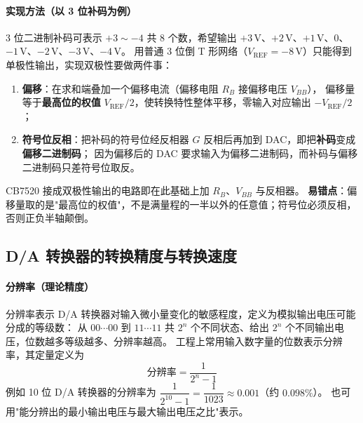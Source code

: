 \paragraph{实现方法（以 3 位补码为例）}
3 位二进制补码可表示 $+3\sim-4$ 共 8 个数，希望输出 $+3\,\mathrm{V}$、$+2\,\mathrm{V}$、$+1\,\mathrm{V}$、$0$、$-1\,\mathrm{V}$、$-2\,\mathrm{V}$、$-3\,\mathrm{V}$、$-4\,\mathrm{V}$。
用普通 3 位倒 T 形网络（$V_\text{REF}=-8\,\mathrm{V}$）只能得到单极性输出，实现双极性要做两件事：
\begin{enumerate}
    \item \textbf{偏移}：在求和端叠加一个偏移电流（偏移电阻 $R_B$ 接偏移电压 $V_{BB}$），
    偏移量等于\textbf{最高位的权值} $V_\text{REF}/2$，使转换特性整体平移，零输入对应输出 $-V_\text{REF}/2$；
    \item \textbf{符号位反相}：把补码的符号位经反相器 $G$ 反相后再加到 DAC，即把\textbf{补码}变成\textbf{偏移二进制码}；
    因为偏移后的 DAC 要求输入为偏移二进制码，而补码与偏移二进制码只差符号位取反。
\end{enumerate}
CB7520 接成双极性输出的电路即在此基础上加 $R_B$、$V_{BB}$ 与反相器。
\textbf{易错点}：偏移量取的是"最高位的权值"，不是满量程的一半以外的任意值；符号位必须反相，否则正负半轴颠倒。

\subsection{D/A 转换器的转换精度与转换速度}
\paragraph{分辨率（理论精度）}
分辨率表示 D/A 转换器对输入微小量变化的敏感程度，定义为模拟输出电压可能分成的等级数：
从 $00\cdots00$ 到 $11\cdots11$ 共 $2^n$ 个不同状态、给出 $2^n$ 个不同输出电压，位数越多等级越多、分辨率越高。
工程上常用输入数字量的位数表示分辨率，其定量定义为
\[
\text{分辨率}=\frac{1}{2^n-1}
\]
例如 10 位 D/A 转换器的分辨率为 $\dfrac{1}{2^{10}-1}=\dfrac{1}{1023}\approx0.001$（约 $0.098\%$）。
也可用"能分辨出的最小输出电压与最大输出电压之比"表示。

